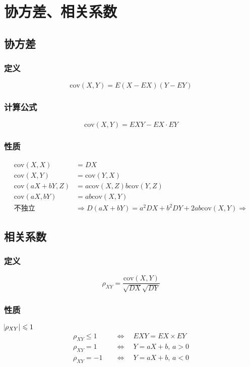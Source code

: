 \section{协方差、相关系数}
\label{sec:协方差_相关系数}

\subsection{协方差}
\label{sub:协方差}

\subsubsection{定义}
\label{ssub:定义}

\[
    \mathrm{cov}(X,Y) = E(X-EX)(Y-EY)
\]

\subsubsection{计算公式}
\label{ssub:计算公式}

\[
    \mathrm{cov}(X,Y) = EXY-EX \cdot EY
\]

\subsubsection{性质}
\label{ssub:性质}

\begin{align}
    \mathrm{cov}(X,X) &= DX \\
    \mathrm{cov}(X,Y) &= \mathrm{cov}(Y,X) \\
    \mathrm{cov}(aX+bY,Z) &= a\mathrm{cov}(X,Z) b\mathrm{cov}(Y,Z) \\
    \mathrm{cov}(aX,bY) &= ab\mathrm{cov}(X,Y) \\
    \text{不独立} & \Rightarrow D(aX+bY) = a^2DX + b^2DY + 2ab\mathrm{cov}(X,Y)
    \Rightarrow
\end{align}

\subsection{相关系数}
\label{sub:相关系数}

\subsubsection{定义}
\label{ssub:定义}

\[
    \rho_{XY} = \frac{\mathrm{cov}(X,Y)}{\sqrt{DX}\sqrt{DY}}
\]

\subsubsection{性质}
\label{ssub:性质}

$\abs{\rho_{XY}} \leqslant 1$
\begin{align}
    \rho_{XY} \leqslant 1 \quad &\Longleftrightarrow \quad EXY = EX \times EY \\
    \rho_{XY} = 1 \quad &\Longleftrightarrow \quad Y =aX+b,\,a>0 \\
    \rho_{XY} =-1 \quad &\Longleftrightarrow \quad Y =aX+b,\,a<0 \\
\end{align}
